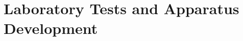 \documentclass[11pt,final,cm,dissertation,proposal]{uhthesis2e}
\begin{document}
\chapter{Laboratory Tests and Apparatus Development}


%

%
%
%
\end{document}
